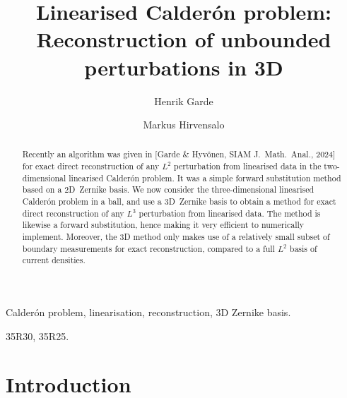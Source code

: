 \documentclass[reqno]{amsart}
\numberwithin{equation}{section}
\numberwithin{figure}{section}
\numberwithin{table}{section}
\theoremstyle{plain}
\theoremstyle{definition}
\theoremstyle{remark}
\begin{document}
\title[Reconstruction of unbounded perturbations in 3D]{Linearised Calder\'on problem: Reconstruction of unbounded perturbations in 3D}
	
\author[H.~Garde]{Henrik Garde}
\address[H.~Garde]{Department of Mathematics, Aarhus University, Ny Munkegade 118, 8000 Aarhus C, Denmark.}
    
\author[M.~Hirvensalo]{Markus Hirvensalo}
\address[M.~Hirvensalo]{Department of Mathematics and Systems Analysis, Aalto University, P.O. Box~11100, 00076 Helsinki, Finland.}
	
\begin{abstract}
    Recently an algorithm was given in [Garde \& Hyv\"onen, SIAM J.\ Math.\ Anal., 2024] for exact direct reconstruction of any $L^2$ perturbation from linearised data in the two-dimensional linearised Calder\'on problem. It was a simple forward substitution method based on a 2D~Zernike basis. We now consider the three-dimensional linearised Calder\'on problem in a ball, and use a 3D~Zernike basis to obtain a method for exact direct reconstruction of any $L^3$ perturbation from linearised data. The method is likewise a forward substitution, hence making it very efficient to numerically implement. Moreover, the 3D method only makes use of a relatively small subset of boundary measurements for exact reconstruction, compared to a full $L^2$ basis of current densities.
\end{abstract}	
\maketitle
	
\KEY
Calder\'on problem, 
linearisation,
reconstruction,
3D Zernike basis.
\EndKEY
	
\MSC
35R30, 35R25.
\EndMSC
 
\section{Introduction} \label{sec:intro}
\end{document}
